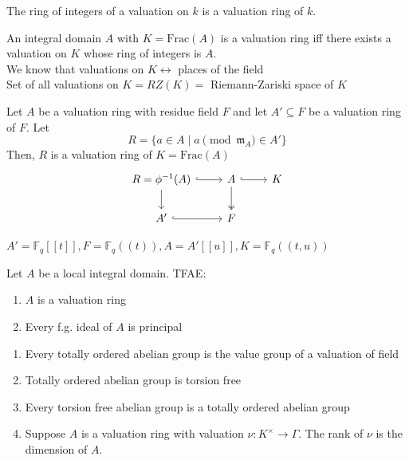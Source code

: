 \documentclass[oneside, 12pt]{scrbook}
\newcommand{\m}{\mathfrak{m}}
\theoremstyle{theorem}
\begin{document}
\begin{proposition}
The ring of integers of a valuation on $k$ is a valuation ring of $k$.
\end{proposition}

An integral domain $A$ with $K = \mathrm{Frac}(A)$ is a valuation ring iff there exists a valuation on $K$ whose ring of integers is $A$. \\

We know that valuations on $K \leftrightarrow$ places of the field \\

Set of all valuations on $K = RZ (K) =$ Riemann-Zariski space of $K$

\begin{proposition}
Let $A$ be a valuation ring with residue field $F$ and let $A' \subseteq F$ be a valuation ring of $F$. Let $$R = \{a\in A \mid a \pmod{\m_{A}} \in A'\}$$
Then, $R$ is a valuation ring of $K= \mathrm{Frac}(A)$
\[\begin{tikzcd}
	{R=\phi^{-1}(A)} & A & K \\
	{A'} & F
	\arrow[hook, from=1-1, to=1-2]
	\arrow[hook, from=1-2, to=1-3]
	\arrow[hook, from=2-1, to=2-2]
	\arrow[two heads, from=1-2, to=2-2]
	\arrow[from=1-1, to=2-1]
\end{tikzcd}\]
\end{proposition}

\begin{exercise}
$A'=\mathbb{F}_{q}[[t]], F= \mathbb{F}_{q}((t)), A=A'[[u]], K = \mathbb{F}_{q}((t,u))$
\end{exercise}

\begin{proposition}
Let $A$ be a local integral domain. TFAE: 
\begin{enumerate}
\item $A$ is a valuation ring
\item Every f.g. ideal of $A$ is principal
\end{enumerate}
\end{proposition}
 
\begin{theorem}
\begin{enumerate}
\item Every totally ordered abelian group is the value group of a valuation of field
\item Totally ordered abelian group is torsion free
\item Every torsion free abelian group is a totally ordered abelian group
\item Suppose $A$ is a valuation ring with valuation $\nu : K^{\times} \rightarrow \Gamma$. The rank of $\nu$ is the dimension of $A$.
\end{enumerate}
\end{theorem} 
\end{document}
